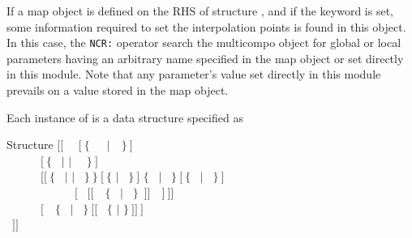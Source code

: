 \vskip -0.5cm

If a {\sc map} object is defined on the RHS of structure , and if the  keyword is set, some information required to set the interpolation points is found in this object. In this case, the {\tt NCR:} operator search the {\sc multicompo} object for global or local parameters  having an arbitrary name specified in the {\sc map} object or set directly in  this module. Note that any parameter's value set directly in this module prevails on a value stored in the {\sc map} object.

Each instance of  is a data structure specified as

\begin{DataStructure}{Structure }
$[[$~ ~$[~\{$~~~$|$~~$\}~]$ \\
~~~~~~$[~\{$~ $|$  $|$ ~~$\}~]$ \\
~~~~~~$[[~\{$~ $|$  $|$ ~$\}~\}~[~\{$  $|$ ~$\}~]$  $\{$~ $|$ ~$\}~[~\{$~ $|$ ~$\}~]$ \\
~~~~~~~~~~~~$[$~ $[[$~~$\{$~ $|$ ~$\}$~$]]$~~$]~]]$  \\
~~~~~~$[$~~$\{$~ $|$ ~$\}~[[$~ $\{$  $|$ \moc{*} $\}~]]~]$ \\
~$]]$
\end{DataStructure}

